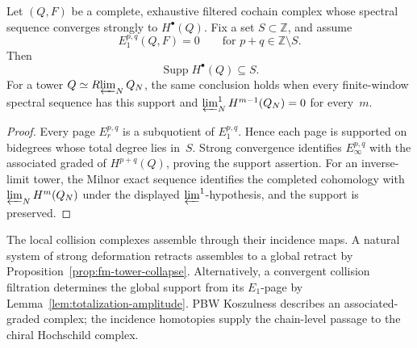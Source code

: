 \begin{lemma}
\label{lem:totalization-amplitude}
Let \((Q,F)\) be a complete, exhaustive filtered cochain complex whose
spectral sequence converges strongly to \(H^\bullet(Q)\).  Fix a set
\(S\subset\mathbb Z\), and assume
\[
 E_1^{p,q}(Q,F)=0
 \qquad\text{for }p+q\in\mathbb Z\setminus S.
\]
Then
\[
 \operatorname{Supp}H^\bullet(Q)\subseteq S.
\]
For a tower \(Q\simeq R\!\varprojlim_NQ_N\), the same conclusion
holds when every finite-window spectral sequence has this support and
\(\varprojlim_N^1H^{m-1}(Q_N)=0\) for every~\(m\).
\end{lemma}

\begin{proof}
Every page \(E_r^{p,q}\) is a subquotient of
\(E_1^{p,q}\).  Hence each page is supported on bidegrees whose total
degree lies in~\(S\).  Strong convergence identifies
\(E_\infty^{p,q}\) with the associated graded of
\(H^{p+q}(Q)\), proving the support assertion.  For an inverse-limit
tower, the Milnor exact sequence identifies the completed cohomology
with \(\varprojlim_NH^m(Q_N)\) under the displayed
\(\varprojlim^1\)-hypothesis, and the support is preserved.
\end{proof}

\begin{remark}
\label{rem:totalization-amplitude-non-triviality}
The local collision complexes assemble through their incidence maps.
A natural system of strong deformation retracts assembles to a global
retract by Proposition~\ref{prop:fm-tower-collapse}.  Alternatively,
a convergent collision filtration determines the global support from
its \(E_1\)-page by Lemma~\ref{lem:totalization-amplitude}.  PBW
Koszulness describes an associated-graded complex; the incidence
homotopies supply the chain-level passage to the chiral Hochschild
complex.
\end{remark}

